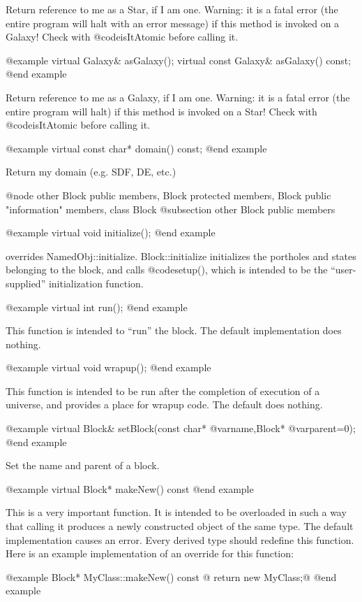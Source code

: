 Return reference to me as a Star, if I am one.  Warning: it is a
fatal error (the entire program will halt with an error message)
if this method is invoked on a Galaxy!  Check with @code{isItAtomic}
before calling it.

@example
virtual Galaxy& asGalaxy();
virtual const Galaxy& asGalaxy() const;
@end example

Return reference to me as a Galaxy, if I am one.  Warning: it is a
fatal error (the entire program will halt) if this method is invoked
on a Star!  Check with @code{isItAtomic} before calling it.

@example
virtual const char* domain() const;
@end example

Return my domain (e.g. SDF, DE, etc.)

@node other Block public members, Block protected members, Block public "information" members, class Block
@subsection other Block public members

@example
virtual void initialize();
@end example

overrides NamedObj::initialize.  Block::initialize initializes the
portholes and states belonging to the block, and calls @code{setup()}, which
is intended to be the ``user-supplied'' initialization function.

@example
virtual int run();
@end example

This function is intended to ``run'' the block.  The default
implementation does nothing.

@example
virtual void wrapup();
@end example

This function is intended to be run after the completion of execution
of a universe, and provides a place for wrapup code.  The default does
nothing.

@example
virtual Block& setBlock(const char* @var{name},Block* @var{parent}=0);
@end example

Set the name and parent of a block.

@example
virtual Block* makeNew() const
@end example

This is a very important function.  It is intended to be overloaded in
such a way that calling it produces a newly constructed object of the
same type.  The default implementation causes an error.  Every derived
type should redefine this function.  Here is an example implementation
of an override for this function:

@example
Block* MyClass::makeNew() const @{ return new MyClass;@}
@end example


